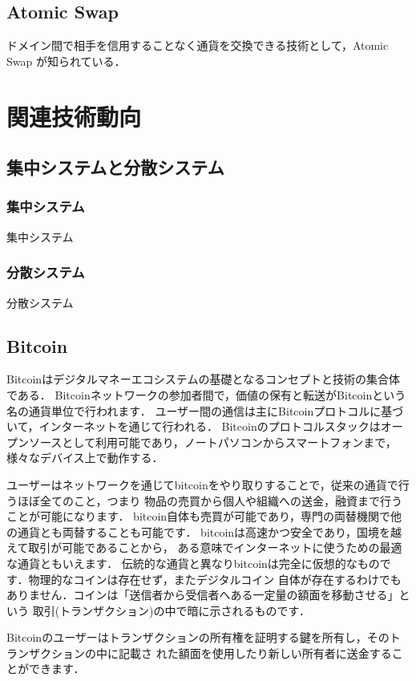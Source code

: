 \documentclass[a4paper,12pt]{jsarticle}
\begin{document}
      \subsection{Atomic Swap}
ドメイン間で相手を信用することなく通貨を交換できる技術として，Atomic Swap \cite{atomicswap}
が知られている．




\section{関連技術動向}
      \subsection{集中システムと分散システム}
            \subsubsection{集中システム}
集中システム

            \subsubsection{分散システム}
分散システム

\subsection{Bitcoin}
Bitcoinはデジタルマネーエコシステムの基礎となるコンセプトと技術の集合体である．
Bitcoinネットワークの参加者間で，価値の保有と転送がBitcoinという名の通貨単位で行われます．
ユーザー間の通信は主にBitcoinプロトコルに基づいて，インターネットを通じて行われる．
Bitcoinのプロトコルスタックはオープンソースとして利用可能であり，ノートパソコンからスマートフォンまで，様々なデバイス上で動作する．

ユーザーはネットワークを通じてbitcoinをやり取りすることで，従来の通貨で行うほぼ全てのこと，つまり
物品の売買から個人や組織への送金，融資まで行うことが可能になります．
bitcoin自体も売買が可能であり，専門の両替機関で他の通貨とも両替することも可能です．
bitcoinは高速かつ安全であり，国境を越えて取引が可能であることから，
ある意味でインターネットに使うための最適な通貨ともいえます．
伝統的な通貨と異なりbitcoinは完全に仮想的なものです．物理的なコインは存在せず，またデジタルコイン
自体が存在するわけでもありません．コインは「送信者から受信者へある一定量の額面を移動させる」という
取引(トランザクション)の中で暗に示されるものです．

Bitcoinのユーザーはトランザクションの所有権を証明する鍵を所有し，そのトランザクションの中に記載さ
れた額面を使用したり新しい所有者に送金することができます．
\end{document}
